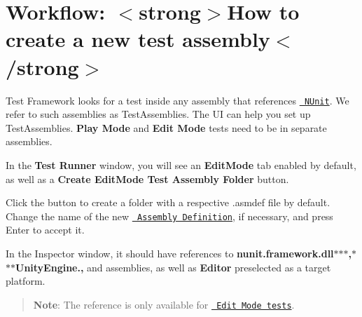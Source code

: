 \chapter{Workflow\+: \texorpdfstring{$<$}{<}strong\texorpdfstring{$>$}{>}How to create a new test assembly\texorpdfstring{$<$}{<}/strong\texorpdfstring{$>$}{>}}
\hypertarget{md__library_2_package_cache_2com_8unity_8test-framework_0d1_81_833_2_documentation_0i_2workflow-create-test-assembly}{}\label{md__library_2_package_cache_2com_8unity_8test-framework_0d1_81_833_2_documentation_0i_2workflow-create-test-assembly}
\label{md__library_2_package_cache_2com_8unity_8test-framework_0d1_81_833_2_documentation_0i_2workflow-create-test-assembly_autotoc_md726}%
%
  Test Framework looks for a test inside any assembly that references \href{http://www.nunit.org/}{\texttt{ NUnit}}. We refer to such assemblies as {\ttfamily Test\+Assemblies}. The  UI can help you set up {\ttfamily Test\+Assemblies}. {\bfseries{Play Mode}} and {\bfseries{Edit Mode}} tests need to be in separate assemblies.

In the {\bfseries{Test Runner}} window, you will see an {\bfseries{Edit\+Mode}} tab enabled by default, as well as a {\bfseries{Create Edit\+Mode Test Assembly Folder}} button.



Click the button to create a {\itshape {}} folder with a respective .asmdef file by default. Change the name of the new \href{https://docs.unity3d.com/Manual/ScriptCompilationAssemblyDefinitionFiles.html}{\texttt{ Assembly Definition}}, if necessary, and press Enter to accept it.



In the Inspector window, it should have references to {\bfseries{nunit.\+framework.\+dll\texorpdfstring{$\ast$}{*}\texorpdfstring{$\ast$}{*}\texorpdfstring{$\ast$}{*},\texorpdfstring{$\ast$}{*} \texorpdfstring{$\ast$}{*}\texorpdfstring{$\ast$}{*}\+Unity\+Engine.,}} and {\bfseries{}} assemblies, as well as {\bfseries{Editor}} preselected as a target platform.

\begin{quote}
{\bfseries{Note}}\+: The {\bfseries{}} reference is only available for \href{./edit-mode-vs-play-mode-tests.md\#edit-mode-tests}{\texttt{ Edit Mode tests}}. \end{quote}
 